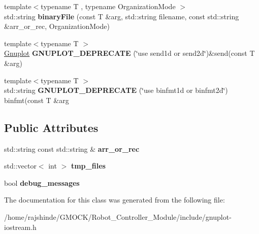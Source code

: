 \begin{DoxyCompactItemize}
\item 
{\footnotesize template$<$typename T , typename Organization\+Mode $>$ }\\std\+::string {\bfseries binary\+File} (const T \&arg, std\+::string filename, const std\+::string \&arr\+\_\+or\+\_\+rec, Organization\+Mode)\hypertarget{classgnuplotio_1_1_gnuplot_ad90501e6dbab5379abcd76fd0e2e4ef1}{}\label{classgnuplotio_1_1_gnuplot_ad90501e6dbab5379abcd76fd0e2e4ef1}

\item 
{\footnotesize template$<$typename T $>$ }\\\hyperlink{classgnuplotio_1_1_gnuplot}{Gnuplot} {\bfseries G\+N\+U\+P\+L\+O\+T\+\_\+\+D\+E\+P\+R\+E\+C\+A\+TE} (\char`\"{}use send1d or send2d\char`\"{})\&send(const T \&arg)\hypertarget{classgnuplotio_1_1_gnuplot_ab2edc3c8f57483c6d9db86d685f3eee7}{}\label{classgnuplotio_1_1_gnuplot_ab2edc3c8f57483c6d9db86d685f3eee7}

\item 
{\footnotesize template$<$typename T $>$ }\\std\+::string {\bfseries G\+N\+U\+P\+L\+O\+T\+\_\+\+D\+E\+P\+R\+E\+C\+A\+TE} (\char`\"{}use binfmt1d or binfmt2d\char`\"{}) binfmt(const T \&arg\hypertarget{classgnuplotio_1_1_gnuplot_aeb3ba94ed04ecd46b55f89591ba23e7c}{}\label{classgnuplotio_1_1_gnuplot_aeb3ba94ed04ecd46b55f89591ba23e7c}

\end{DoxyCompactItemize}
\subsection*{Public Attributes}
\begin{DoxyCompactItemize}
\item 
std\+::string const std\+::string \& {\bfseries arr\+\_\+or\+\_\+rec}\hypertarget{classgnuplotio_1_1_gnuplot_a2d194dbd4d2f3475ff6f9b8384e62a9f}{}\label{classgnuplotio_1_1_gnuplot_a2d194dbd4d2f3475ff6f9b8384e62a9f}

\item 
std\+::vector$<$ int $>$ {\bfseries tmp\+\_\+files}\hypertarget{classgnuplotio_1_1_gnuplot_a92a4f6322e486de17db4507a5fc77348}{}\label{classgnuplotio_1_1_gnuplot_a92a4f6322e486de17db4507a5fc77348}

\item 
bool {\bfseries debug\+\_\+messages}\hypertarget{classgnuplotio_1_1_gnuplot_a63e08bfd0cd02937d895ecfb6180107c}{}\label{classgnuplotio_1_1_gnuplot_a63e08bfd0cd02937d895ecfb6180107c}

\end{DoxyCompactItemize}


The documentation for this class was generated from the following file\+:\begin{DoxyCompactItemize}
\item 
/home/rajshinde/\+G\+M\+O\+C\+K/\+Robot\+\_\+\+Controller\+\_\+\+Module/include/gnuplot-\/iostream.\+h\end{DoxyCompactItemize}
